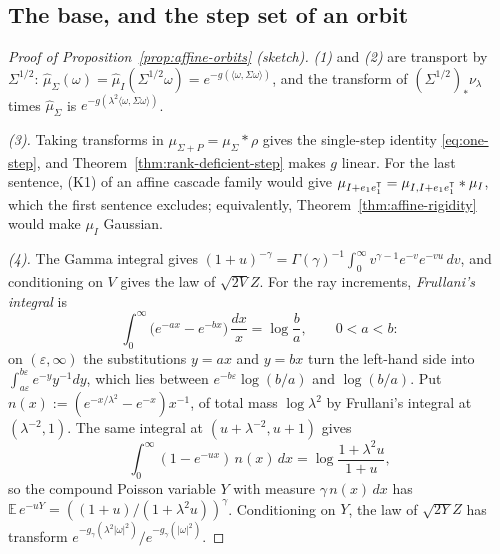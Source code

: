 \subsection{The base, and the step set of an orbit}

\begin{proof}[Proof of Proposition~\ref{prop:affine-orbits} (sketch)]
\emph{(1)} and \emph{(2)} are transport by $\Sigma^{1/2}$:
$\widehat\mu_\Sigma(\omega) = \widehat\mu_I(\Sigma^{1/2}\omega) = e^{-g(\langle\omega,\Sigma\omega\rangle)}$,
and the transform of $(\Sigma^{1/2})_*\nu_\lambda$ times $\widehat\mu_\Sigma$ is
$e^{-g(\lambda^2\langle\omega,\Sigma\omega\rangle)}$.

\emph{(3).} Taking transforms in $\mu_{\Sigma+P} = \mu_\Sigma * \rho$ gives the single-step identity
\ref{eq:one-step}, and Theorem~\ref{thm:rank-deficient-step} makes $g$ linear. For the last sentence,
(K1) of an affine cascade family would give $\mu_{I+e_1e_1^{\mathsf{T}}} = \mu_{I,I+e_1e_1^{\mathsf{T}}} * \mu_I$,
which the first sentence excludes; equivalently, Theorem~\ref{thm:affine-rigidity} would make $\mu_I$
Gaussian.

\emph{(4).} The Gamma integral gives $(1+u)^{-\gamma} = \Gamma(\gamma)^{-1}\int_0^\infty
v^{\gamma-1}e^{-v}e^{-vu}\,dv$, and conditioning on $V$ gives the law of $\sqrt{2V}Z$. For the ray
increments, \emph{Frullani's integral} is
\[
  \int_0^\infty\bigl(e^{-ax} - e^{-bx}\bigr)\,\frac{dx}{x} = \log\frac ba , \qquad 0 < a < b :
\]
on $(\varepsilon, \infty)$ the substitutions $y = ax$ and $y = bx$ turn the left-hand side into
$\int_{a\varepsilon}^{b\varepsilon}e^{-y}y^{-1}dy$, which lies between $e^{-b\varepsilon}\log(b/a)$ and
$\log(b/a)$. Put $n(x) := (e^{-x/\lambda^2} - e^{-x})x^{-1}$, of total mass $\log\lambda^2$ by Frullani's
integral at $(\lambda^{-2}, 1)$. The same integral at $(u + \lambda^{-2}, u + 1)$ gives
\[
  \int_0^\infty(1 - e^{-ux})\,n(x)\,dx = \log\frac{1+\lambda^2u}{1+u} ,
\]
so the compound Poisson variable $Y$ with \Levy{} measure $\gamma\,n(x)\,dx$ has
$\mathbb{E}\,e^{-uY} = ((1+u)/(1+\lambda^2u))^\gamma$. Conditioning on $Y$, the law of $\sqrt{2Y}Z$ has
transform $e^{-g_\gamma(\lambda^2|\omega|^2)}/e^{-g_\gamma(|\omega|^2)}$.
\end{proof}

